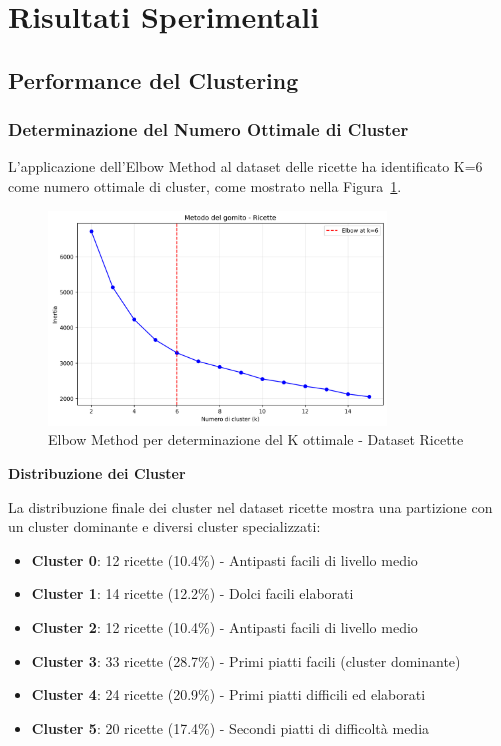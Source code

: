 \documentclass[12pt,a4paper]{article}
\begin{document}
\section{Risultati Sperimentali}

\subsection{Performance del Clustering}

\subsubsection{Determinazione del Numero Ottimale di Cluster}

L'applicazione dell'Elbow Method al dataset delle ricette ha identificato K=6 come numero ottimale di cluster, come mostrato nella Figura~\ref{fig:elbow_ricette}.

\begin{figure}[H]
\centering
\includegraphics[width=0.8\textwidth]{dati/elbow_method_ricette.png}
\caption{Elbow Method per determinazione del K ottimale - Dataset Ricette}
\label{fig:elbow_ricette}
\end{figure}

\textbf{Distribuzione dei Cluster}

La distribuzione finale dei cluster nel dataset ricette mostra una partizione con un cluster dominante e diversi cluster specializzati:

\begin{itemize}
    \item \textbf{Cluster 0}: 12 ricette (10.4\%) - Antipasti facili di livello medio
    \item \textbf{Cluster 1}: 14 ricette (12.2\%) - Dolci facili elaborati
    \item \textbf{Cluster 2}: 12 ricette (10.4\%) - Antipasti facili di livello medio
    \item \textbf{Cluster 3}: 33 ricette (28.7\%) - Primi piatti facili (cluster dominante)
    \item \textbf{Cluster 4}: 24 ricette (20.9\%) - Primi piatti difficili ed elaborati
    \item \textbf{Cluster 5}: 20 ricette (17.4\%) - Secondi piatti di difficoltà media
\end{itemize}
\end{document}
